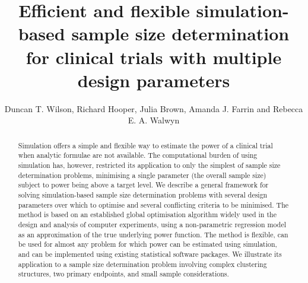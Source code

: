 \documentclass[sagev, Crown]{sagej}
\begin{document}

\title{Efficient and flexible simulation-based sample size determination for clinical trials with multiple design parameters}

\author{Duncan T. Wilson, 
Richard Hooper,
Julia Brown, 
Amanda J. Farrin and
Rebecca E. A. Walwyn}



\begin{abstract}

Simulation offers a simple and flexible way to estimate the power of a clinical trial when analytic formulae are not available. The computational burden of using simulation has, however, restricted its application to only the simplest of sample size determination problems, minimising a single parameter (the overall sample size) subject to power being above a target level. We describe a general framework for solving simulation-based sample size determination problems with several design parameters over which to optimise and several conflicting criteria to be minimised. The method is based on an established global optimisation algorithm widely used in the design and analysis of computer experiments, using a non-parametric regression model as an approximation of the true underlying power function. The method is flexible, can be used for almost any problem for which power can be estimated using simulation, and can be implemented using existing statistical software packages. We illustrate its application to a sample size determination problem involving complex clustering structures, two primary endpoints, and small sample considerations.
\end{abstract}


\maketitle
\end{document}
